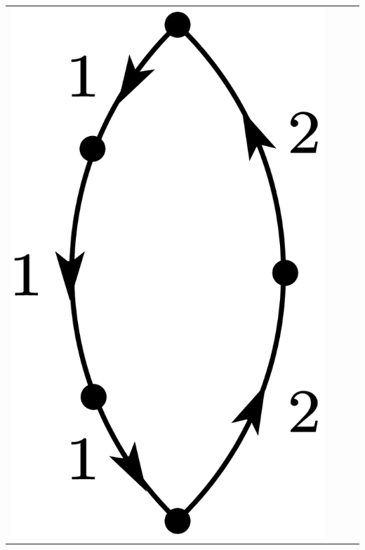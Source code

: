 \documentclass[a4paper]{book}
\newcounter{solution}[chapter]
\begin{document}
\begin{solution}
\begin{center}
\begin{tabular}{cccc}
		\begin{minipage}{0.22\linewidth}
		\centering
		\includegraphics[scale=1.0,trim=0 -4 0 -4]{./pictures/6.01/3.png}
		\captionof*{figure}{$\displaystyle (-1)^{3+1} \frac{ V^2_{11} V_{12} V_{21} V_{22} }{ ( E^{(0)}_1 - E^{(0)}_2)^4 }$}
		\end{minipage} &
		

\end{tabular}
\end{center}
\end{solution}
\end{document}
